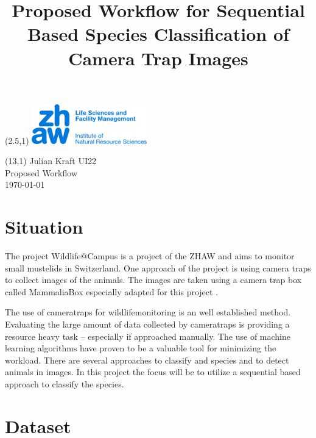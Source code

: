 \documentclass{article}
\title{Proposed Workflow for Sequential Based Species Classification of Camera Trap Images}
\makeatletter
\renewcommand{\maketitle}{
  \begin{flushleft} 
    \Large\textmd{\@title} 
    \par
  \end{flushleft}
}
\makeatother
\begin{document}
\begin{textblock}{5}(2.5,1) %
  \includegraphics[width=5cm]{logo.jpg} %
\end{textblock}

\begin{textblock}{6}(13,1) %
        \raggedleft
        Julian Kraft UI22\\
        Proposed Workflow\\
        \today
\end{textblock}

\vspace*{1.5cm}


\maketitle


\section*{Situation}

The project Wildlife@Campus is a project of the ZHAW and aims to monitor small mustelids in Switzerland.
One approach of the project is using camera traps to collect images of the animals. 
The images are taken using a camera trap box called MammaliaBox especially adapted for this
project \autocite{grafWildlifeCampusKleineSaeugetiere2022}.

The use of cameratraps for wildlifemonitoring is an well established method. Evaluating the large amount of data collected by cameratraps
is providing a resource heavy task -- especially if approached manually. The use of machine learning algorithms 
have proven to be a valuable tool for minimizing the workload. There are several approaches to classify and species and
to detect animals in images. In this project the focus will be to utilize a sequential based approach to classify the species.

\section*{Dataset}
\end{document}
